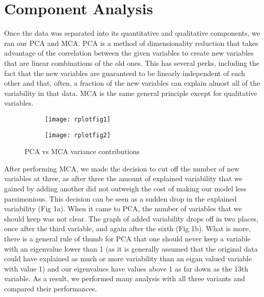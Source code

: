 \documentclass[11pt, oneside]{article}   	%
\begin{document}
\section{Component Analysis}

Once the data was separated into its quantitative and qualitative components, we ran our PCA and MCA. PCA is a method of dimensionality reduction that takes advantage of the correlation between the given variables to create new variables that are linear combinations of the old ones. This has several perks, including the fact that the new variables are guaranteed to be linearly independent of each other and that, often, a fraction of the new variables can explain almost all of the variability in that data. MCA is the same general principle except for qualitative variables. 
\begin{figure}[h]
\centering
\begin{subfigure}{.5\textwidth}
  \centering
  \texttt{[image: rplotfig1]}
  \caption{}
  \label{fig:1}
\end{subfigure}%
\begin{subfigure}{.5\textwidth}
  \centering
  \texttt{[image: rplotfig2]}
  \caption{}
  \label{fig:2}
\end{subfigure}
\caption{PCA vs MCA variance contributions}
\label{}
\end{figure}

After performing MCA, we made the decision to cut off the number of new variables at three, as after three the amount of explained variability that we gained by adding another did not outweigh the cost of making our model less parsimonious. This decision can be seen as a sudden drop in the explained variability (Fig 1a). When it came to PCA, the number of variables that we should keep was not clear. The graph of added variability drops off in two places, once after the third variable, and again after the sixth (Fig 1b). What is more, there is a general rule of thumb for PCA that one should never keep a variable with an eigenvalue lower than 1 (as it is generally assumed that the original data could have explained as much or more variability than an eigan valued variable with value 1) and our eigenvalues have values above 1 as far down as the 13th variable. As a result, we performed many analysis with all three variants and compared their performances. 
\end{document}
